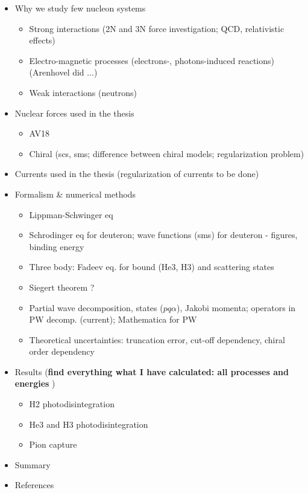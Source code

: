 \begin{itemize}
    \item Why we study few nucleon systems
    \begin{itemize}
        \item Strong interactions (2N and 3N force investigation; QCD, relativistic effects)
        \item Electro-magnetic processes (electrons-, photons-induced reactions) (Arenhovel did ...)
        \item Weak interactions (neutrons)
    \end{itemize}

    \item Nuclear forces used in the thesis
    \begin{itemize}
        \item AV18
        \item Chiral (scs, sms; difference between chiral models; regularization problem)
    \end{itemize}

    \item Currents used in the thesis (regularization of currents to be done)
    
    \item Formalism \& numerical methods
    \begin{itemize}
        \item Lippman-Schwinger eq
        \item Schrodinger eq for deuteron; wave functions (sms) for deuteron - figures, binding energy
        \item Three body: Fadeev eq. for bound (He3, H3) and scattering states
        \item Siegert theorem ?
        \item Partial wave decomposition, states ($pq\alpha$), Jakobi momenta;
        operators in PW decomp. (current); Mathematica for PW
        \item Theoretical uncertainties: truncation error, cut-off dependency, chiral order dependency
    \end{itemize}

    \item Results (\textbf{find everything what I have calculated: all processes and energies} )
    \begin{itemize}
        \item H2 photodisintegration
        \item He3 and H3 photodisintegration
        \item Pion capture
    \end{itemize}

    \item Summary
    
    \item References
\end{itemize}

